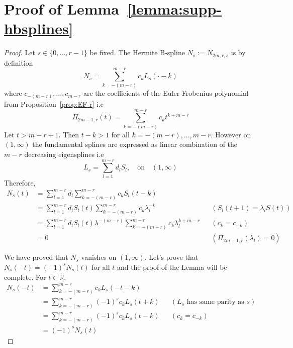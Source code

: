 \section{Proof of Lemma~\ref{lemma:supp-hbsplines}}\label{proof:supp-hbsplines}
\begin{proof}
  Let $s \in \{0, \ldots, r-1\}$ be fixed. The Hermite B-spline $N_s := N_{2m,r,s}$ is by definition
  \begin{equation*}
    N_s = \sum_{k=-(m-r)}^{m-r} c_k L_s(\cdot-k)
  \end{equation*}
  where $c_{-(m-r)}, \ldots, c_{m-r}$ are the coefficients of the Euler-Frobenius polynomial from 
  Proposition~\ref{prop:EF-r} i.e
  \begin{equation*}
    \Pi_{2m-1,r}(t) = \sum_{k = -(m-r)}^{m-r} c_k t^{k+m-r}
  \end{equation*}
  Let $t > m-r+1$. Then $t-k > 1$ for all $k=-(m-r), \ldots, m-r$. However on $(1,\infty)$ the fundamental splines are 
  expressed as linear combination of the $m-r$ decreasing eigensplines i.e
  \begin{equation*}
    L_s = \sum_{l=1}^{m-r} d_l S_l, \quad \text{on} \quad (1, \infty)
  \end{equation*}
  Therefore,
  \begin{align*}
    N_s(t) &= \sum_{l=1}^{m-r} d_l \sum_{k=-(m-r)}^{m-r} c_k S_l(t-k) \\
    &= \sum_{l=1}^{m-r} d_l S_l(t) \sum_{k=-(m-r)}^{m-r} c_k \lambda_l^{-k} & &(S_l(t+1) = \lambda_l S(t))\\
    &= \sum_{l=1}^{m-r} d_l S_l(t) \lambda^{-(m-r)} \sum_{k=-(m-r)}^{m-r} c_k \lambda_l^{k+m-r} & &(c_k = c_{-k}) \\
    &= 0 & &(\Pi_{2m-1,r}(\lambda_l) = 0)
  \end{align*}
  
  We have proved that $N_s$ vanishes on $(1, \infty)$. Let's prove that $N_s(-t) = {(-1)}^{s}N_s(t)$ for all $t$ and the 
  proof of the Lemma will be complete.  For $t \in \mathbb{R}$,
  \begin{align*}
    N_s(-t) &= \sum_{k=-(m-r)}^{m-r} c_k L_s(-t-k) \\
    &= \sum_{k=-(m-r)}^{m-r} {(-1)}^s c_k L_s(t+k)  & &(\text{$L_s$ has same parity as $s$}) \\
    &= \sum_{k=-(m-r)}^{m-r} {(-1)}^s c_k L_s(t-k) & &(c_k = c_{-k})\\
    &= {(-1)}^s N_s(t)
  \end{align*}
\end{proof}

